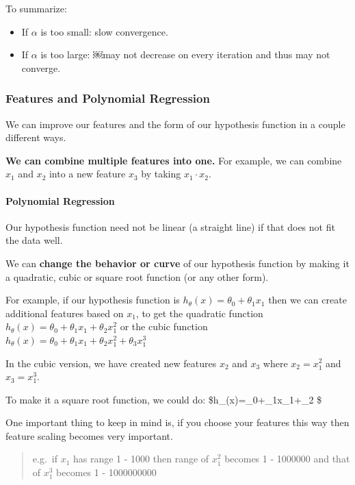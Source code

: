 \documentclass[11pt]{article}
\providecommand{\tightlist}{%
      \setlength{\itemsep}{0pt}\setlength{\parskip}{0pt}}
\begin{document}
To summarize:

\begin{itemize}
\tightlist
\item
  If \(\alpha\) is too small: slow convergence.
\item
  If \(\alpha\) is too large: ￼may not decrease on every iteration and
  thus may not converge.
\end{itemize}

\hypertarget{features-and-polynomial-regression}{%
\subsubsection{Features and Polynomial
Regression}\label{features-and-polynomial-regression}}

We can improve our features and the form of our hypothesis function in a
couple different ways.

\textbf{We can combine multiple features into one.} For example, we can
combine \(x_1\) and \(x_2\) into a new feature \(x_3\) by taking
\(x_1\cdot x_2\).

\hypertarget{polynomial-regression}{%
\paragraph{Polynomial Regression}\label{polynomial-regression}}

Our hypothesis function need not be linear (a straight line) if that
does not fit the data well.

We can \textbf{change the behavior or curve} of our hypothesis function
by making it a quadratic, cubic or square root function (or any other
form).

For example, if our hypothesis function is
\(h_\theta(x)=\theta_0+\theta_1 x_1\) then we can create additional
features based on \(x_1\), to get the quadratic function
\(h_\theta(x)=\theta_0+\theta_1x_1+\theta_2x^2_1\) or the cubic function
\(h_\theta(x)=\theta_0+\theta_1x_1+\theta_2x^2_1+\theta_3x^3_1\)

In the cubic version, we have created new features \(x_2\) and \(x_3\)
where \(x_2=x^2_1\) and \(x_3=x^3_1\).

To make it a square root function, we could do:
\$h\_\theta(x)=\theta\_0+\theta\_1x\_1+\theta\_2  \$

One important thing to keep in mind is, if you choose your features this
way then feature scaling becomes very important.

\begin{quote}
e.g.~if \(x_1\) has range 1 - 1000 then range of \(x^2_1\) becomes 1 -
1000000 and that of \(x^3_1\) becomes 1 - 1000000000
\end{quote}
\end{document}
